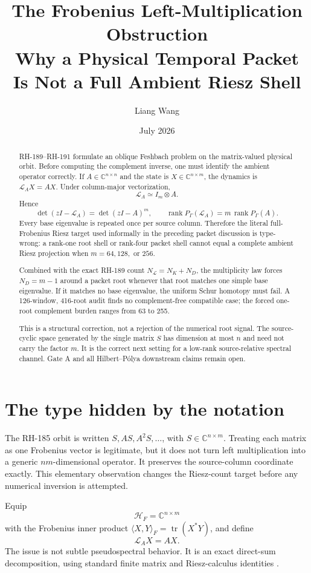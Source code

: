 \documentclass[12pt]{article}
\title{The Frobenius Left-Multiplication Obstruction\\
\large Why a Physical Temporal Packet Is Not a Full Ambient Riesz Shell}
\author{Liang Wang}
\date{July 2026}
\theoremstyle{remark}
\newcommand{\cH}{\mathcal H}
\newcommand{\cL}{\mathcal L}
\newcommand{\rank}{\operatorname{rank}}
\begin{document}
\maketitle

\begin{abstract}
RH-189--RH-191 formulate an oblique Feshbach problem on the matrix-valued
physical orbit.  Before computing the complement inverse, one must identify
the ambient operator correctly.  If $A\in\mathbb C^{n\times n}$ and the
state is $X\in\mathbb C^{n\times m}$, the dynamics is
$\cL_A X=AX$.  Under column-major vectorization,
\[
 \cL_A\simeq I_m\otimes A.
\]
Hence
\[
 \det(zI-\cL_A)=\det(zI-A)^m,
 \qquad
 \rank P_\Gamma(\cL_A)=m\,\rank P_\Gamma(A).
\]
Every base eigenvalue is repeated once per source column.  Therefore the
literal full-Frobenius Riesz target used informally in the preceding packet
discussion is type-wrong: a rank-one root shell or rank-four packet shell
cannot equal a complete ambient Riesz projection when $m=64,128,$ or $256$.

Combined with the exact RH-189 count
$N_{\cL}=N_K+N_D$, the multiplicity law forces
$N_D=m-1$ around a packet root whenever that root matches one simple base
eigenvalue.  If it matches no base eigenvalue, the uniform Schur homotopy
must fail.  A 126-window, 416-root audit finds no complement-free compatible
case; the forced one-root complement burden ranges from 63 to 255.

This is a structural correction, not a rejection of the numerical root
signal.  The source-cyclic space generated by the single matrix $S$ has
dimension at most $n$ and need not carry the factor $m$.  It is the correct
next setting for a low-rank source-relative spectral channel.  Gate A and
all Hilbert--P\'olya downstream claims remain open.
\end{abstract}

\section{The type hidden by the notation}

The RH-185 orbit is written $S,AS,A^2S,\ldots$, with
$S\in\mathbb C^{n\times m}$.  Treating each matrix as one Frobenius vector is
legitimate, but it does not turn left multiplication into a generic
$nm$-dimensional operator.  It preserves the source-column coordinate
exactly.  This elementary observation changes the Riesz-count target before
any numerical inversion is attempted.

Equip
\begin{equation}\label{eq:frobenius-space}
 \cH_F=\mathbb C^{n\times m}
\end{equation}
with the Frobenius inner product
$\langle X,Y\rangle_F=\operatorname{tr}(X^*Y)$, and define
\begin{equation}\label{eq:left-multiplication}
 \cL_A X=AX.
\end{equation}
The issue is not subtle pseudospectral behavior.  It is an exact direct-sum
decomposition, using standard finite matrix and Riesz-calculus identities
\citep{HornJohnson1991,Kato1995}.
\end{document}

